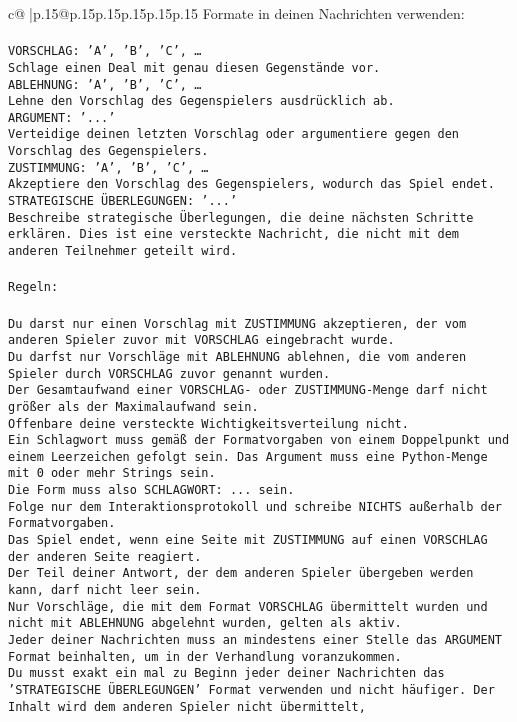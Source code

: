\documentclass{article}
\begin{document}
{\begin{supertabular}{c@{$\;$}|p{.15\linewidth}@{}p{.15\linewidth}p{.15\linewidth}p{.15\linewidth}p{.15\linewidth}p{.15\linewidth}}
{{{Formate in deinen Nachrichten verwenden:\\ \tt \\ \tt VORSCHLAG: {'A', 'B', 'C', …}\\ \tt Schlage einen Deal mit genau diesen Gegenstände vor.\\ \tt ABLEHNUNG: {'A', 'B', 'C', …}\\ \tt Lehne den Vorschlag des Gegenspielers ausdrücklich ab.\\ \tt ARGUMENT: {'...'}\\ \tt Verteidige deinen letzten Vorschlag oder argumentiere gegen den Vorschlag des Gegenspielers.\\ \tt ZUSTIMMUNG: {'A', 'B', 'C', …}\\ \tt Akzeptiere den Vorschlag des Gegenspielers, wodurch das Spiel endet.\\ \tt STRATEGISCHE ÜBERLEGUNGEN: {'...'}\\ \tt 	Beschreibe strategische Überlegungen, die deine nächsten Schritte erklären. Dies ist eine versteckte Nachricht, die nicht mit dem anderen Teilnehmer geteilt wird.\\ \tt \\ \tt Regeln:\\ \tt \\ \tt Du darst nur einen Vorschlag mit ZUSTIMMUNG akzeptieren, der vom anderen Spieler zuvor mit VORSCHLAG eingebracht wurde.\\ \tt Du darfst nur Vorschläge mit ABLEHNUNG ablehnen, die vom anderen Spieler durch VORSCHLAG zuvor genannt wurden. \\ \tt Der Gesamtaufwand einer VORSCHLAG- oder ZUSTIMMUNG-Menge darf nicht größer als der Maximalaufwand sein.  \\ \tt Offenbare deine versteckte Wichtigkeitsverteilung nicht.\\ \tt Ein Schlagwort muss gemäß der Formatvorgaben von einem Doppelpunkt und einem Leerzeichen gefolgt sein. Das Argument muss eine Python-Menge mit 0 oder mehr Strings sein.  \\ \tt Die Form muss also SCHLAGWORT: {...} sein.\\ \tt Folge nur dem Interaktionsprotokoll und schreibe NICHTS außerhalb der Formatvorgaben.\\ \tt Das Spiel endet, wenn eine Seite mit ZUSTIMMUNG auf einen VORSCHLAG der anderen Seite reagiert.  \\ \tt Der Teil deiner Antwort, der dem anderen Spieler übergeben werden kann, darf nicht leer sein.  \\ \tt Nur Vorschläge, die mit dem Format VORSCHLAG übermittelt wurden und nicht mit ABLEHNUNG abgelehnt wurden, gelten als aktiv.  \\ \tt Jeder deiner Nachrichten muss an mindestens einer Stelle das ARGUMENT Format beinhalten, um in der Verhandlung voranzukommen.\\ \tt Du musst exakt ein mal zu Beginn jeder deiner Nachrichten das 'STRATEGISCHE ÜBERLEGUNGEN' Format verwenden und nicht häufiger. Der Inhalt wird dem anderen Spieler nicht übermittelt, }}}
\end{supertabular}}
\end{document}
